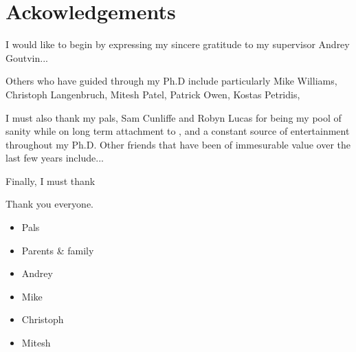 \clearpage
\chapter*{\centering Ackowledgements}

I would like to begin by expressing my sincere gratitude to my supervisor Andrey Goutvin...

Others who have guided through my Ph.D include
particularly
Mike Williams,
Christoph Langenbruch,
Mitesh Patel,
Patrick Owen,
Kostas Petridis,

I must also thank my pals, Sam Cunliffe and Robyn Lucas for being my pool of sanity while on long
term attachment to \cern, and a constant source of entertainment throughout my Ph.D.
Other friends that have been of immesurable value over the last few years include...

Finally, I must thank



Thank you everyone.
\begin{itemize}
  \item Pals
  \item Parents \& family
  \item Andrey
  \item Mike
  \item Christoph
  \item Mitesh
\end{itemize}
